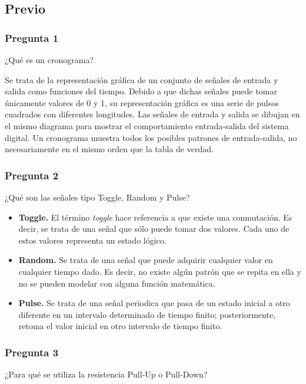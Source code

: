 \documentclass[../procedimientos.tex]{subfiles}
\begin{document}
\subsection{Previo}
\subsubsection*{Pregunta 1}
\begin{em}
  ¿Qué es un cronograma?
\end{em}

Se trata de la representación gráfica de un conjunto de señales de entrada y 
salida como funciones del tiempo. Debido a que dichas señales puede tomar 
únicamente valores de 0 y 1, su representación gráfica es una serie de pulsos 
cuadrados con diferentes longitudes. Las señales de entrada y salida se 
dibujan en el mismo diagrama para mostrar el comportamiento entrada-salida del 
sistema digital. Un cronograma muestra todos los posibles patrones de 
entrada-salida, no necesariamente en el mismo orden que la tabla de verdad.


\subsubsection*{Pregunta 2}
\begin{em}
  ¿Qué son las señales tipo Toggle, Random y Pulse?
\end{em}
\begin{itemize}
  \item \textbf{Toggle.} El término \textit{toggle} hace referencia a que 
    existe una conmutación. Es decir, se trata de una señal que sólo puede 
    tomar dos valores. Cada uno de estos valores representa un estado lógico.
  \item \textbf{Random.} Se trata de una señal que puede adquirir cualquier 
    valor en cualquier tiempo dado. Es decir, no existe algún patrón que se 
    repita en ella y no se pueden modelar con alguna función matemática.
  \item \textbf{Pulse.} Se trata de una señal periodica que pasa de un estado 
    inicial a otro diferente en un intervalo determinado de tiempo finito; 
    posteriormente, retoma el valor inicial en otro intervalo de tiempo 
    finito.
\end{itemize}


\subsubsection*{Pregunta 3}
\begin{em}
  ¿Para qué se utiliza la resistencia Pull-Up o Pull-Down?
\end{em}
\end{document}
